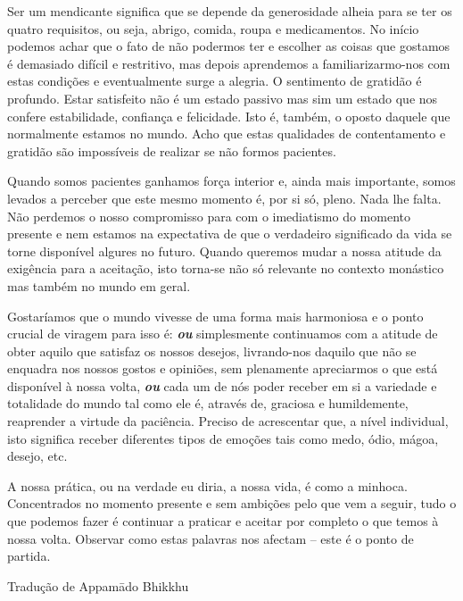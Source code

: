 Ser um mendicante significa que se depende da generosidade alheia para
se ter os quatro requisitos, ou seja, abrigo, comida, roupa e
medicamentos. No início podemos achar que o fato de não podermos ter e
escolher as coisas que gostamos é demasiado difícil e restritivo, mas
depois aprendemos a familiarizarmo-nos com estas condições e
eventualmente surge a alegria. O sentimento de gratidão é profundo.
Estar satisfeito não é um estado passivo mas sim um estado que nos
confere estabilidade, confiança e felicidade. Isto é, também, o oposto
daquele que normalmente estamos no mundo. Acho que estas qualidades de
contentamento e gratidão são impossíveis de realizar se não formos
pacientes.

Quando somos pacientes ganhamos força interior e, ainda mais importante,
somos levados a perceber que este mesmo momento é, por si só, pleno.
Nada lhe falta. Não perdemos o nosso compromisso para com o imediatismo
do momento presente e nem estamos na expectativa de que o verdadeiro
significado da vida se torne disponível algures no futuro. Quando
queremos mudar a nossa atitude da exigência para a aceitação, isto
torna-se não só relevante no contexto monástico mas também no mundo em
geral.

Gostaríamos que o mundo vivesse de uma forma mais harmoniosa e o ponto
crucial de viragem para isso é: \emph{\textbf{ou}} simplesmente
continuamos com a atitude de obter aquilo que satisfaz os nossos
desejos, livrando-nos daquilo que não se enquadra nos nossos gostos e
opiniões, sem plenamente apreciarmos o que está disponível à nossa
volta, \emph{\textbf{ou}} cada um de nós poder receber em si a variedade
e totalidade do mundo tal como ele é, através de, graciosa e
humildemente, reaprender a virtude da paciência. Preciso de acrescentar
que, a nível individual, isto significa receber diferentes tipos de
emoções tais como medo, ódio, mágoa, desejo, etc.

A nossa prática, ou na verdade eu diria, a nossa vida, é como a minhoca.
Concentrados no momento presente e sem ambições pelo que vem a seguir,
tudo o que podemos fazer é continuar a praticar e aceitar por completo o
que temos à nossa volta. Observar como estas palavras nos afectam --
este é o ponto de partida.

Tradução de Appamādo Bhikkhu
